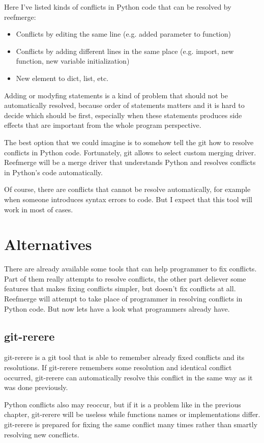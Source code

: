 \documentclass[a4paper,10pt]{article}
\begin{document}
Here I've listed kinds of conflicts in Python code that can be resolved by reefmerge:
\begin{itemize}
\item Conflicts by editing the same line (e.g. added parameter to function)
\item Conflicts by adding different lines in the same place (e.g. import, new function, new variable initialization)
\item New element to dict, list, etc.
\end{itemize}
Adding or modyfing statements is a kind of problem that should not be automatically resolved,
because order of statements matters and it is hard to decide which should be first,
especially when these statements produces side effects that are important from the whole program perspective.

The best option that we could imagine is to somehow tell the git how to resolve conflicts
in Python code. Fortunately, git allows to select custom merging driver.
Reefmerge will be a merge driver that understands Python and resolves conflicts in Python's code automatically.

Of course, there are conflicts that cannot be resolve automatically, for example when someone introduces
syntax errors to code. But I expect that this tool will work in most of cases.

\section*{Alternatives}

There are already available some tools that can help programmer to fix conflicts.
Part of them really attempts to resolve conflicts, the other part deliever some features
that makes fixing conflicts simpler, but doesn't fix conflicts at all.
Reefmerge will attempt to take place of programmer in resolving conflicts in Python code.
But now lets have a look what programmers already have.

\subsection*{git-rerere}
git-rerere is a git tool that is able to remember already fixed conflicts
and its resolutions. If git-rerere remembers some resolution and identical conflict occurred,
git-rerere can automatically resolve this conflict in the same way as it was done previously.

Python conflicts also may reoccur, but if it is a problem like in the previous chapter,
git-rerere will be useless while functions names or implementations differ.
git-rerere is prepared for fixing the same conflict many times rather than smartly resolving new concflicts.
\end{document}
